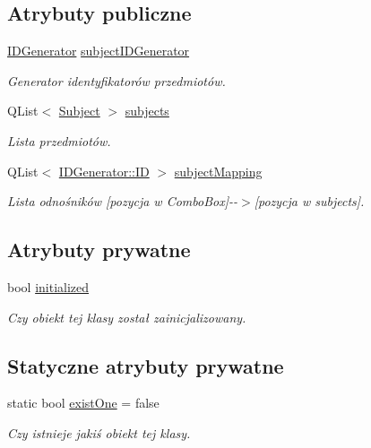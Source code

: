 \subsection*{Atrybuty publiczne}
\begin{DoxyCompactItemize}
\item 
\hyperlink{classIDGenerator}{IDGenerator} \hyperlink{classSubjects_a31677c61fa2c31db7b8d17ac96ddd83e}{subjectIDGenerator}
\begin{DoxyCompactList}\small\item\em Generator identyfikatorów przedmiotów. \item\end{DoxyCompactList}\item 
QList$<$ \hyperlink{classSubject}{Subject} $>$ \hyperlink{classSubjects_a8e97b147f9bdef32d49612c04b87e348}{subjects}
\begin{DoxyCompactList}\small\item\em Lista przedmiotów. \item\end{DoxyCompactList}\item 
QList$<$ \hyperlink{classIDGenerator_1_1ID}{IDGenerator::ID} $>$ \hyperlink{classSubjects_ac97553ca1a09d08d019ae1bd2f017615}{subjectMapping}
\begin{DoxyCompactList}\small\item\em Lista odnośników \mbox{[}pozycja w ComboBox\mbox{]}-\/-\/$>$\mbox{[}pozycja w subjects\mbox{]}. \item\end{DoxyCompactList}\end{DoxyCompactItemize}
\subsection*{Atrybuty prywatne}
\begin{DoxyCompactItemize}
\item 
bool \hyperlink{classSubjects_aa7ef99d4c5a3e333205fab3733176f17}{initialized}
\begin{DoxyCompactList}\small\item\em Czy obiekt tej klasy został zainicjalizowany. \item\end{DoxyCompactList}\end{DoxyCompactItemize}
\subsection*{Statyczne atrybuty prywatne}
\begin{DoxyCompactItemize}
\item 
static bool \hyperlink{classSubjects_ae5f842f095e3091ce71261dc415435f8}{existOne} = false
\begin{DoxyCompactList}\small\item\em Czy istnieje jakiś obiekt tej klasy. \item\end{DoxyCompactList}\end{DoxyCompactItemize}


